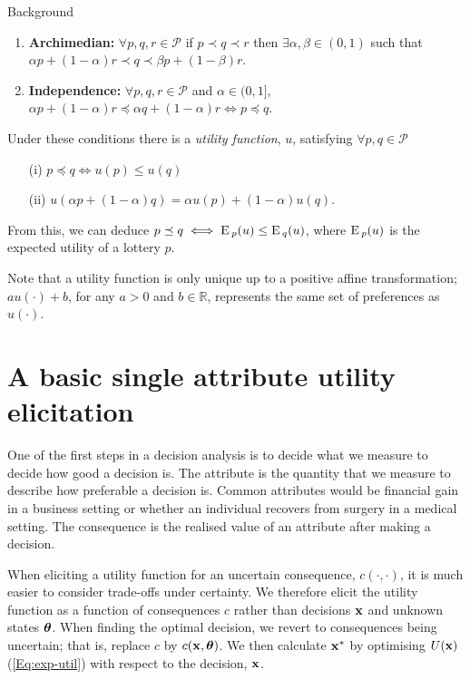 \begin{chapter}{Background \label{Ch:background}}
\begin{enumerate}
\item \textbf{Archimedian:} $\forall p, q, r \in \mathcal{P}$ if $p \prec q \prec r$ then $\exists \alpha, \beta \in (0, 1) $ such that $\alpha p + (1-\alpha)r \prec q \prec \beta p + (1-\beta) r$.

\item \textbf{Independence:} $\forall p, q, r \in \mathcal{P}$ and $\alpha \in (0, 1]$, $\alpha p + (1-\alpha)r \preceq \alpha q + (1-\alpha) r \iff p \preceq q$.
\end{enumerate}
Under these conditions there is a \textit{utility function}, $u$, satisfying $\forall p, q \in \mathcal{P}$
\begin{enumerate}
\item[(i)] $p \preceq q \iff u(p) \leq u(q)$
\item[(ii)] $u(\alpha p + (1-\alpha) q) = \alpha u(p) + (1- \alpha)u(q)$.
\end{enumerate}
From this, we can deduce $p \preceq q \iff \textrm{E}\,_p(u) \leq \textrm{E}\,_q(u)$, where $\textrm{E}\,_p(u)$ is the expected utility of a lottery $p$.

Note that a utility function is only unique up to a positive affine transformation; $au(\cdot) + b$, for any $a >0$ and $b \in \mathbb{R}$, represents the same set of preferences as $u(\cdot)$.

\section{A basic single attribute utility elicitation}

One of the first steps in a decision analysis is to decide what we measure to decide how good a decision is. The attribute is the quantity that we measure to describe how preferable a decision is. Common attributes would be financial gain in a business setting or whether an individual recovers from surgery in a medical setting. The consequence is the realised value of an attribute after making a decision.

When eliciting a utility function for an uncertain consequence, $c(\cdot, \cdot)$, it is much easier to consider trade-offs under certainty. We therefore elicit the utility function as a function of consequences $c$ rather than decisions $\mathbf{x}$ and unknown states $\bm{\theta}$. When finding the optimal decision, we revert to consequences being uncertain; that is, replace $c$ by $c(\mathbf{x}, \bm{\theta})$. We then calculate $\mathbf{x}^{*}$ by optimising $U(\mathbf{x})$ (\cref{Eq:exp-util}) with respect to the decision, $\mathbf{x}$.


\end{chapter}

